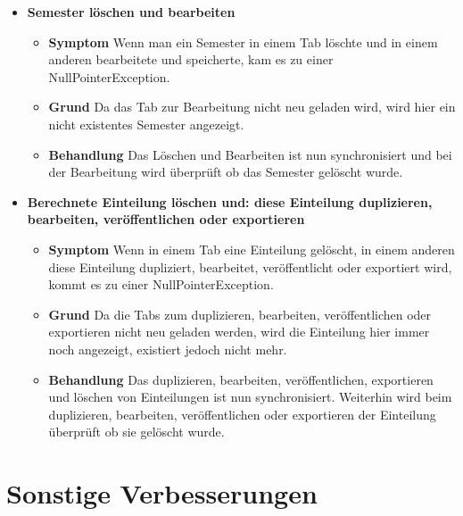 \documentclass[parskip=full]{scrartcl}
\newcommand{\fehler}[4]{\textbf{#1}
 							\begin{itemize}
 							  \item \textbf{Symptom}  #2
 							  \item \textbf{Grund} #3
 							  \item \textbf{Behandlung} #4
 							\end{itemize}}
\newcommand{\code}[1]{{\ttfamily #1}}
\begin{document}
\begin{itemize}
{    kann man das aktive Semester nun nur noch umstellen, wenn die
    Einteilungswarteschlange leer ist.}
    \item \fehler{Semester löschen und bearbeiten}{Wenn man ein Semester in
    einem Tab löschte und in einem anderen bearbeitete und speicherte, kam es zu
    einer \code{NullPointerException}. }{Da das Tab zur Bearbeitung nicht
    neu geladen wird, wird hier ein nicht existentes Semester angezeigt.}{Das
    Löschen und Bearbeiten ist nun synchronisiert und bei der Bearbeitung wird
    überprüft ob das Semester gelöscht wurde.}
    \item \fehler{Berechnete Einteilung löschen und: diese Einteilung
    duplizieren, bearbeiten, veröffentlichen oder exportieren}{Wenn in
    einem Tab eine Einteilung gelöscht, in einem anderen diese Einteilung
    dupliziert, bearbeitet, veröffentlicht oder exportiert wird, kommt es zu
    einer \code{NullPointerException}. }{Da die Tabs zum duplizieren,
    bearbeiten, veröffentlichen oder exportieren nicht neu geladen werden,
    wird die Einteilung hier immer noch angezeigt, existiert jedoch nicht
    mehr.}{Das duplizieren, bearbeiten, veröffentlichen, exportieren und
    löschen von Einteilungen ist nun synchronisiert. Weiterhin wird beim
    duplizieren, bearbeiten, veröffentlichen oder exportieren der Einteilung
    überprüft ob sie gelöscht wurde.}
\end{itemize}


\section{Sonstige Verbesserungen}
\end{document}
